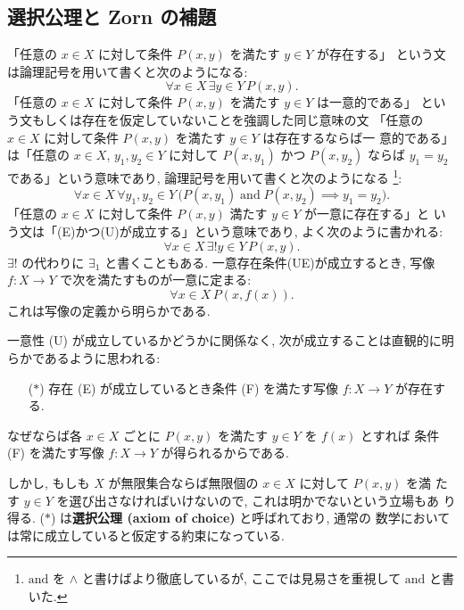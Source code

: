 \documentclass[12pt,twoside]{jarticle}
\begin{document}

\subsection{選択公理と Zorn の補題}
\label{sec:axiom-of-choice}

「任意の $x\in X$ に対して条件 $P(x,y)$ を満たす $y\in Y$ が存在する」
という文は論理記号を用いて書くと次のようになる:
\begin{equation*}
  \forall x\in X\, \exists y\in Y\, P(x,y).
  \tag{E}
\end{equation*}
「任意の $x\in X$ に対して条件 $P(x,y)$ を満たす $y\in Y$ は一意的である」
という文もしくは存在を仮定していないことを強調した同じ意味の文
「任意の $x\in X$ に対して条件 $P(x,y)$ を満たす $y\in Y$ は存在するならば一
意的である」は「任意の $x\in X$, $y_1,y_2\in Y$ に対して $P(x,y_1)$ 
かつ $P(x,y_2)$ ならば $y_1=y_2$ である」という意味であり, 
論理記号を用いて書くと次のようになる%
\footnote{$\text{and}$ を $\wedge$ と書けばより徹底しているが,
  ここでは見易さを重視して $\text{and}$ と書いた.}:
\begin{equation*}
  \forall x\in X\, \forall y_1,y_2\in Y\,
  \bigl( P(x,y_1)\;\text{and}\;P(x,y_2) \implies y_1=y_2 \bigr).
  \tag{U}
\end{equation*}
「任意の $x\in X$ に対して条件 $P(x,y)$ 満たす $y\in Y$ が一意に存在する」と
いう文は「(E)かつ(U)が成立する」という意味であり, よく次のように書かれる:
\begin{equation*}
  \forall x\in X\, \exists! y\in Y\, P(x,y).
  \tag{UE}
\end{equation*}
$\exists!$ の代わりに $\exists_1$ と書くこともある.
一意存在条件(UE)が成立するとき, 
写像 $f:X\to Y$ で次を満たすものが一意に定まる:
\begin{equation*}
  \forall x\in X\, P(x,f(x)).
  \tag{F}
\end{equation*}
これは写像の定義から明らかである.

一意性 (U) が成立しているかどうかに関係なく, 
次が成立することは直観的に明らかであるように思われる:
\begin{itemize}
\item[($\ast$)] 存在 (E) が成立しているとき条件 (F) を満たす写像 $f:X\to Y$ 
  が存在する.
\end{itemize}
なぜならば各 $x\in X$ ごとに $P(x,y)$ を満たす $y\in Y$ を $f(x)$ とすれば
条件 (F) を満たす写像 $f:X\to Y$ が得られるからである.

しかし, もしも $X$ が無限集合ならば無限個の $x\in X$ に対して $P(x,y)$ を満
たす $y\in Y$ を選び出さなければいけないので, これは明かでないという立場もあ
り得る.  ($\ast$) は{\bf 選択公理 (axiom of choice)} と呼ばれており, 通常の
数学においては常に成立していると仮定する約束になっている.  
\end{document}
